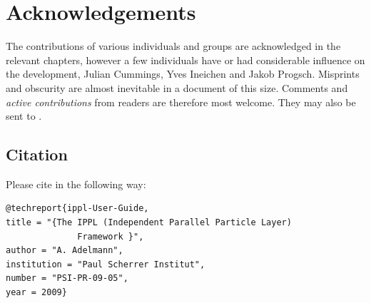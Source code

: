 \clearpage
\section{Acknowledgements}
The contributions of various individuals and groups are acknowledged in the relevant chapters,
however a few individuals have or had considerable influence on the
development, Julian Cummings, Yves Ineichen and Jakob Progsch.
Misprints and obscurity are almost inevitable in a document of this size.
Comments and {\em active contributions}  from readers are therefore most welcome.
They may also be sent to .

\subsection{Citation}
Please cite \ippl in the following way:
\begin{small}
\begin{verbatim}
@techreport{ippl-User-Guide,
title = "{The IPPL (Independent Parallel Particle Layer)
              Framework }",
author = "A. Adelmann",
institution = "Paul Scherrer Institut",
number = "PSI-PR-09-05",
year = 2009}
\end{verbatim}
\end{small}


